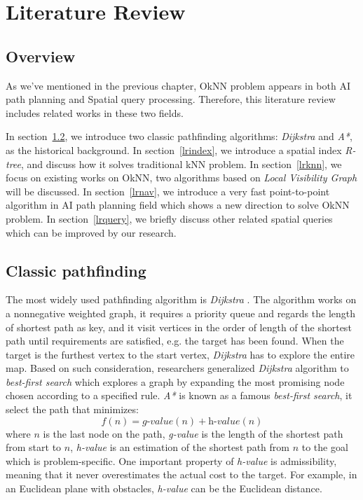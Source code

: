\chapter{Literature Review}\label{lreview}
\section{Overview}\label{lroverview}
As we've mentioned in the previous chapter, OkNN problem appears in both
AI path planning and Spatial query processing. Therefore, this literature review includes
related works in these two fields.

In section~\ref{lrai}, we introduce two classic pathfinding algorithms:
\textit{Dijkstra} and \textit{A*}, as the historical background.
In section~\ref{lrindex}, we introduce a spatial index \textit{R-tree},
and discuss how it solves traditional kNN problem.
In section~\ref{lrknn}, we focus on existing works on OkNN, two algorithms based on
\textit{Local Visibility Graph} will be discussed. 
In section~\ref{lrnav}, we introduce a very fast point-to-point algorithm in AI path planning
field which shows a new direction to solve OkNN problem.
In section~\ref{lrquery}, we briefly discuss other related spatial queries which can be
improved by our research.

\section{Classic pathfinding}\label{lrai}
The most widely used pathfinding algorithm is \textit{Dijkstra} \cite{dijkstra1959note}. 
The algorithm works on a nonnegative weighted graph, it requires a priority queue and
regards the length of shortest path as key, and it visit vertices in the order
of length of the shortest path until requirements are satisfied, e.g. the target has been found.
When the target is the furthest vertex to the start vertex, \textit{Dijkstra} has to explore the entire
map. Based on such consideration, researchers generalized \textit{Dijkstra} algorithm to
\textit{best-first search} which explores a graph by expanding the most promising node chosen
according to a specified rule.
\textit{A*} \cite{hart1968formal} is known as a famous \textit{best-first search},
it select the path that minimizes:
$$
f(n) = \textit{g-value}(n) + \textit{h-value}(n)
$$
where $n$ is the last node on the path, \textit{g-value} is the length of the shortest path from start to
$n$, \textit{h-value} is an estimation of the shortest path from $n$ to the goal which is
problem-specific. One important property of \textit{h-value} is admissibility, meaning that it never
overestimates the actual cost to the target.
For example, in an Euclidean plane with obstacles, \textit{h-value} can be the Euclidean
distance.

